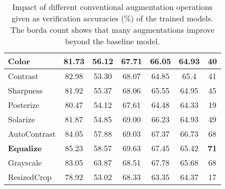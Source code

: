 \documentclass[10pt,twocolumn,letterpaper]{ieeeconf}
\begin{document}
\begin{table}[h!]
{\begin{tabular}{|l|c|c|c|c|c|c|}
Color                                                                      & 81.73        & 56.12            & 67.71           & 66.05          & 64.93          & 40                                                              \\ \hline
Contrast                                                                  & 82.98        & 53.30            & 68.07           & 64.85          & 65.4           & 41                                                              \\ \hline
Sharpness                                                                 & 81.92        & 55.37            & 68.06           & 65.55          & 64.95          & 45                                                              \\ \hline
Posterize                                                                 & 80.47        & 54.12            & 67.61           & 64.48          & 64.33          & 19                                                              \\ \hline
Solarize                                                                  & 81.87        & 54.85            & 69.00           & 66.23          & 64.93          & 49                                                              \\ \hline
AutoContrast                                                              & 84.05        & 57.88            & 69.03           & 67.37          & 66.73          & 68                                                              \\ \hline
\textbf{Equalize}                                                                  & 85.23        & 58.57            & 69.63           & 67.45          & 65.42          & \textbf{71}                                                              \\ \hline
Grayscale                                                                 & 83.05        & 63.87            & 68.51           & 67.78          & 65.68          & 68                                                              \\ \hline
ResizedCrop                                                               & 78.92        & 53.02            & 68.33           & 63.35          & 64.37          & 17                                                              \\ \hline
\end{tabular}}
\caption{Impact of different conventional augmentation operations given as verification accuracies (\%) of the trained models. 
The borda count shows that many augmentations improve beyond the baseline model.}
\label{tab:RA_operations}
\vspace{-4mm}
\end{table}
\end{document}

